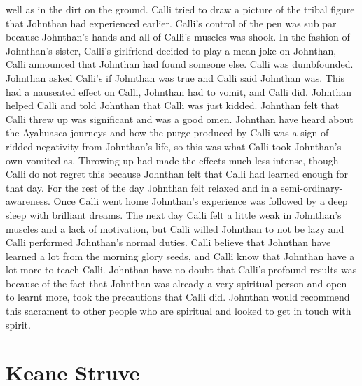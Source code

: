 \documentclass[12pt]{book}
\begin{document}
well as in the dirt on the ground. Calli tried to draw a picture of the tribal figure that Johnthan had experienced earlier. Calli's control of the pen was sub par because Johnthan's hands and all of Calli's muscles was shook. In the fashion of Johnthan's sister, Calli's girlfriend decided to play a mean joke on Johnthan, Calli announced that Johnthan had found someone else. Calli was dumbfounded. Johnthan asked Calli's if Johnthan was true and Calli said Johnthan was. This had a nauseated effect on Calli, Johnthan had to vomit, and Calli did. Johnthan helped Calli and told Johnthan that Calli was just kidded. Johnthan felt that Calli threw up was significant and was a good omen. Johnthan have heard about the Ayahuasca journeys and how the purge produced by Calli was a sign of ridded negativity from Johnthan's life, so this was what Calli took Johnthan's own vomited as. Throwing up had made the effects much less intense, though Calli do not regret this because Johnthan felt that Calli had learned enough for that day. For the rest of the day Johnthan felt relaxed and in a semi-ordinary-awareness. Once Calli went home Johnthan's experience was followed by a deep sleep with brilliant dreams. The next day Calli felt a little weak in Johnthan's muscles and a lack of motivation, but Calli willed Johnthan to not be lazy and Calli performed Johnthan's normal duties. Calli believe that Johnthan have learned a lot from the morning glory seeds, and Calli know that Johnthan have a lot more to teach Calli. Johnthan have no doubt that Calli's profound results was because of the fact that Johnthan was already a very spiritual person and open to learnt more, took the precautions that Calli did. Johnthan would recommend this sacrament to other people who are spiritual and looked to get in touch with spirit.



\chapter{Keane Struve}
\end{document}
